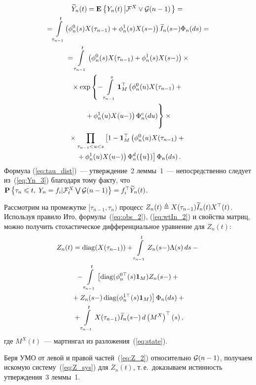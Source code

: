 \begin{multicols}{2}
{ \noindent
 \begin{multline}
 \widetilde{Y}_n(t) =\me{}{Y_n(t)\left|\ff^X \vee \G(n-1)\right.}
 ={}\\
 {}= \!\int\limits_{\tau_{n-1}}^{t}\!\left(\phi^0_{n}(s)X(\tau_{n-1})+\phi^1_{n}(s)X(s-)
 \right) \widetilde{I}_n(s-)\Phi_{n}(ds) = {}\\
 {}=
 \int\limits_{\tau_{n-1}}^{t}\left(\phi^0_{n}(s)X(\tau_{n-1})+\phi^1_{n}(s)X(s-)
 \right) \times{} \\
 {}\times
 \exp \left\{
 -\int\limits_{\tau_{n-1}}^s \mathbf{1}_M^{\top}\left(
 \phi^0_n(u)X(\tau_{n-1})+{}\right.\right.\\
\left.\left. {}+\phi^1_n(u)X(u-)
 \right)\Phi^c_n(du)
 \vphantom{\int\limits_{\tau_{n-1}}^s}
 \right\} \times{} \\
{} \times \prod\limits_{\tau_{n-1} < u < s}\left[
 1-  \mathbf{1}_M^{\top}\left(
 \phi^0_n(u)X(\tau_{n-1})+{}\right.\right.\\
\left.\left. {}+\phi^1_n(u)X(u-)
 \right)\Phi^d_n(\{u\})
 \right]
 \Phi_{n}(ds)\,.
 \label{eq:Yn_3}
 \end{multline}
 Формула (\ref{eq:tau_dist})~--- утверждение~2 леммы~1~---
 непосредственно следует из~(\ref{eq:Yn_3}) благодаря тому факту,
 что $\pp{\tau_n \leqslant t, \; Y_n \hm= f_i | \ff_{t}^X  \bigvee \G (n-1)}
 \hm= f_i^{\top}\widetilde{Y}_n(t)$.

 Рассмотрим на промежутке $[\tau_{n-1},\tau_n)$ процесс
 $Z_n(t) \triangleq X(\tau_{n-1}) \widetilde{I}_{n}(t)X^{\top}(t)$.
 Используя правило Ито, формулы~(\ref{eq:obs_2}), (\ref{eq:wtIn_2}) и
 свойства матриц, можно получить стохастическое дифференциальное уравнение
 для $Z_n(t)$:
 \begin{multline}
 Z_n(t)=\mathop{\mathrm{diag}}(X(\tau_{n-1})) +
 \int\limits_{\tau_{n-1}}^t Z_n(s-)\Lambda(s)\,ds -{}\\
 {}-\int\limits_{\tau_{n-1}}^t
 \left[\mathop{\mathrm{diag}}(\phi^{0\top}_n(s)\mathbf{1}_M)
 Z_n(s-)+{}\right.
\\
\left. {}+Z_n(s-)\mathop{\mathrm{diag}}(\phi^{1\top}_n(s)\mathbf{1}_M)
 \right]\Phi_n(ds)+ {}\\
 {}+ \int\limits_{\tau_{n-1}}^t X(\tau_{n-1})\widetilde{I}_n(s-)\,d\left(M^{X}
 \right)^{\top}(s)\,,
 \label{eq:Z_2}
 \end{multline}
 где $M^{X}(t)$~--- мартингал из разложения~(\ref{eq:state}).

 Беря УМО от левой и правой частей~(\ref{eq:Z_2}) относительно ${\mathcal G}(n-1)$,
 получаем искомую систему~(\ref{eq:Z_sys}) для $\overline{Z}_n(t)$, т.\,е.\
 доказываем истинность утверждения~3 леммы~1.

}
\end{multicols}
